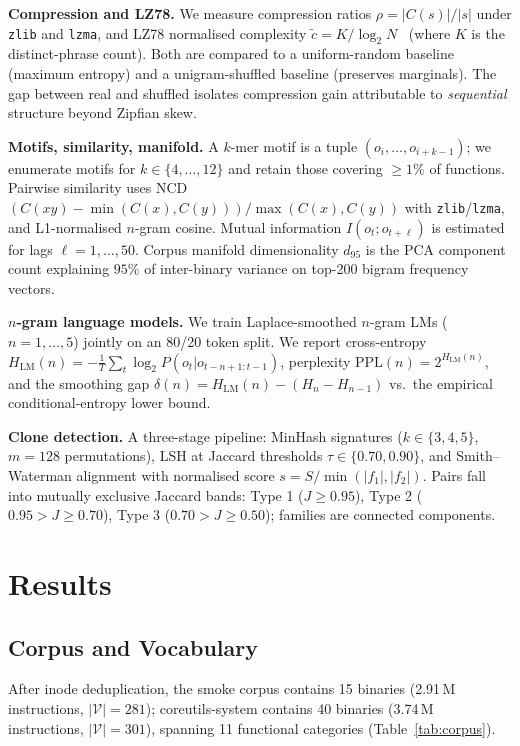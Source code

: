 \documentclass[conference]{IEEEtran}
\newcommand{\zlib}{\texttt{zlib}}
\newcommand{\lzma}{\texttt{lzma}}
\begin{document}
\textbf{Compression and LZ78.}
We measure compression ratios $\rho{=}|C(s)|/|s|$ under \zlib{} and
\lzma{}, and LZ78 normalised complexity
$\tilde{c}{=}K/\log_2 N$~\cite{ziv1978compression} (where $K$ is the
distinct-phrase count).  Both are compared to a uniform-random baseline
(maximum entropy) and a unigram-shuffled baseline (preserves marginals).
The gap between real and shuffled isolates compression gain attributable
to \emph{sequential} structure beyond Zipfian skew.

\textbf{Motifs, similarity, manifold.}
A $k$-mer motif is a tuple $(o_i,\dots,o_{i+k-1})$; we enumerate motifs
for $k{\in}\{4,\dots,12\}$ and retain those covering ${\geq}1\%$ of
functions.  Pairwise similarity uses NCD
$(C(xy)-\min(C(x),C(y)))/\max(C(x),C(y))$ with \zlib{}/\lzma{}, and
L1-normalised $n$-gram cosine.  Mutual information $I(o_t;o_{t+\ell})$
is estimated for lags $\ell{=}1,\dots,50$.  Corpus manifold
dimensionality $d_{95}$ is the PCA component count explaining $95\%$
of inter-binary variance on top-200 bigram frequency vectors.

\textbf{$n$-gram language models.}
We train Laplace-smoothed $n$-gram LMs ($n{=}1,\dots,5$) jointly on an
80/20 token split.  We report cross-entropy
$H_{\mathrm{LM}}(n){=}-\tfrac{1}{T}\sum_t\log_2 P(o_t|o_{t-n+1:t-1})$,
perplexity $\mathrm{PPL}(n){=}2^{H_{\mathrm{LM}}(n)}$, and the smoothing
gap $\delta(n){=}H_{\mathrm{LM}}(n)-(H_n-H_{n-1})$ vs.\ the empirical
conditional-entropy lower bound.

\textbf{Clone detection.}
A three-stage pipeline: MinHash signatures
($k{\in}\{3,4,5\}$, $m{=}128$ permutations), LSH at Jaccard thresholds
$\tau{\in}\{0.70,0.90\}$, and Smith--Waterman alignment with normalised
score $s{=}S/\min(|f_1|,|f_2|)$.  Pairs fall into mutually exclusive
Jaccard bands: Type 1 ($J{\geq}0.95$), Type 2 ($0.95{>}J{\geq}0.70$),
Type 3 ($0.70{>}J{\geq}0.50$); families are connected components.

\section{Results}
\label{sec:results}

\subsection{Corpus and Vocabulary}

After inode deduplication, the smoke corpus contains 15 binaries
(2.91\,M instructions, $|\mathcal{V}|{=}281$); coreutils-system contains
40 binaries (3.74\,M instructions, $|\mathcal{V}|{=}301$),
spanning 11 functional categories (Table~\ref{tab:corpus}).
\end{document}

